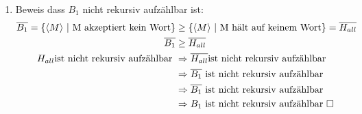 \documentclass{article}
\begin{document}
\begin{enumerate} [label=(\alph*).]
\begin{enumerate}[label=\Roman*.]
\begin{enumerate}[label=]
					$\Rightarrow \langle M_{neu} \rangle \in A_{62}$\\
					$\Rightarrow f(w) \in A_{62}$
					\\\\	
					$w \notin H_{\epsilon} \Rightarrow$ M hält nicht auf $\epsilon$\\
					$\Rightarrow \langle M_{neu} \rangle$ hält auf keiner Eingabe\\
					$\Rightarrow \langle M_{neu} \rangle \notin A_{62}$\\
					$\Rightarrow f(w) \notin A_{62}$\\
					Daher ist $H_{\epsilon} \leq A_{62} \Rightarrow A_{62}$ ist nicht Rekursiv.  
				\end{enumerate}
			\item $A_{62}$ ist aufzählbar:\\
			Es gibt eine TM M die $A_{62}$ erkennt mit folgenden Eigenschaften:
			\begin{enumerate}[label=$\bullet$]
				\item M Simuliert alle Gödelnummern parallel. Also jeweils einen Schritt auf allen Nummern pro Iteration.
				\item Die Simulation funktioniert indem jeweils wieder ein Schritt auf jedem Wort mit l $\leq$ 62 Simuliert wird.
				\item Werden dabei zwei Wörter Akzeptiert "druckt" M die korrespondierende Gödelnummer.
			\end{enumerate}
			\end{enumerate}
			\item Beweis dass $B_1$ nicht rekursiv aufzählbar ist:
			\begin{equation*}
			\begin{aligned}
			\overline{B_1} = \{\langle M \rangle\textnormal{ | M akzeptiert kein Wort}\} &\geq
			\{\langle M \rangle\textnormal{ | M hält auf keinem Wort}\} = \overline{H_{all}}\\
			\overline{B_1} &\geq \overline{H_{all}}\\
			H_{all} \textnormal{ist nicht rekursiv aufzählbar } &\Rightarrow \overline{H_{all}}\textnormal{ist nicht rekursiv aufzählbar }\\
			&\Rightarrow \overline{B_1}\textnormal{ ist nicht rekursiv aufzählbar}\\
			&\Rightarrow \overline{B_1} \textnormal{ ist nicht rekursiv aufzählbar}\\
			&\Rightarrow B_1 \textnormal{ ist nicht rekursiv aufzählbar } \square
			\end{aligned}
			\end{equation*}
		\end{enumerate}
		
\end{document}
